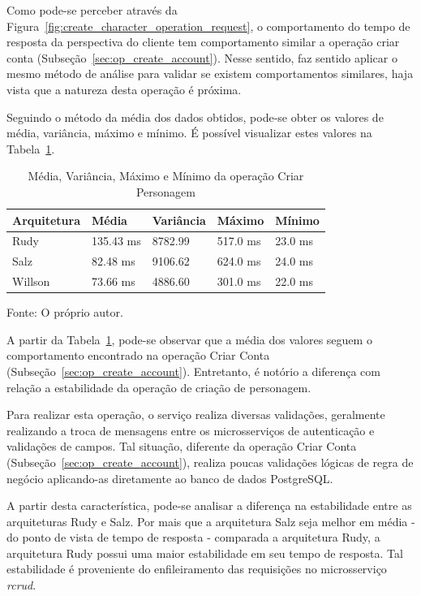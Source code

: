 Como pode-se perceber através da Figura~\ref{fig:create_character_operation_request}, o comportamento do tempo de resposta da perspectiva do cliente tem comportamento similar a operação criar conta (Subseção~\ref{sec:op_create_account}).
%
Nesse sentido, faz sentido aplicar o mesmo método de análise para validar se existem comportamentos similares, haja vista que a natureza desta operação é próxima.

Seguindo o método da média dos dados obtidos, pode-se obter os valores de média, variância, máximo e mínimo.
%
É possível visualizar estes valores na Tabela~\ref{tab:create_character_operation_request}.

\begin{table}[htb!]
\centering
\begin{adjustbox}{max width=\textwidth}
\caption{Média, Variância, Máximo e Mínimo da operação Criar Personagem}
\label{tab:create_character_operation_request}
\begin{tabular}{l|l|l|l|l}
\hline \hline
Arquitetura & Média     & Variância & Máximo    & Mínimo  \\ \hline \hline
Rudy        & 135.43 ms & 8782.99 & 517.0 ms & 23.0 ms \\ \hline
Salz        & 82.48 ms & 9106.62  & 624.0 ms & 24.0 ms \\ \hline
Willson     & 73.66 ms & 4886.60  & 301.0 ms  & 22.0 ms \\ \hline \hline
\end{tabular}

\end{adjustbox}

Fonte: O próprio autor.
\end{table}

A partir da Tabela~\ref{tab:create_character_operation_request}, pode-se observar que a média dos valores seguem o comportamento encontrado na operação Criar Conta (Subseção~\ref{sec:op_create_account}). 
%
Entretanto, é notório a diferença com relação a estabilidade da operação de criação de personagem.

Para realizar esta operação, o serviço realiza diversas validações, geralmente realizando a troca de mensagens entre os microsserviços de autenticação e validações de campos.
%
Tal situação, diferente da operação Criar Conta (Subseção~\ref{sec:op_create_account}), realiza poucas validações lógicas de regra de negócio aplicando-as diretamente ao banco de dados PostgreSQL.

A partir desta característica, pode-se analisar a diferença na estabilidade entre as arquiteturas Rudy e Salz.
%
Por mais que a arquitetura Salz seja melhor em média - do ponto de vista de tempo de resposta - comparada a arquitetura Rudy, a arquitetura Rudy possui uma maior estabilidade em seu tempo de resposta.
%
Tal estabilidade é proveniente do enfileiramento das requisições no microsserviço \textit{rcrud}.


